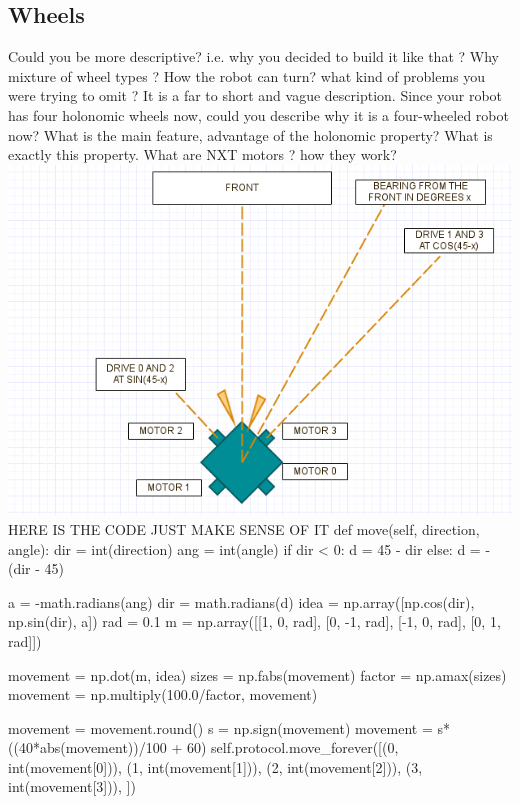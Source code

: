 \documentclass[a4paper,12pt]{article}
\begin{document}
\subsection{Wheels}
Could you be more descriptive? i.e. why you decided to build it like that ? Why mixture of wheel types ? How the robot can turn? what kind of problems you were trying to omit ? It is a far to short and vague description.  Since your robot has four holonomic wheels now, could you describe why it is a four-wheeled robot now? What is the main feature, advantage of the holonomic property? What is exactly this property.  What are NXT motors ? how they work?
\includegraphics[scale=.5]{holonomics.png}
HERE IS THE CODE JUST MAKE SENSE OF IT\newline\newline
def move(self, direction, angle):
        dir = int(direction)
        ang = int(angle)
        if dir < 0:
            d = 45 - dir
        else:
            d = -(dir - 45)

        a = -math.radians(ang)
        dir = math.radians(d)
        idea = np.array([np.cos(dir), np.sin(dir), a])
        rad = 0.1
        m = np.array([[1, 0, rad],
                      [0, -1, rad],
                      [-1, 0, rad],
                      [0, 1, rad]])

        movement = np.dot(m, idea)
        sizes = np.fabs(movement)
        factor = np.amax(sizes)
        movement = np.multiply(100.0/factor, movement)

        movement = movement.round()
        s = np.sign(movement)
        movement = s*((40*abs(movement))/100 + 60)
        self.protocol.move\_forever([(0, int(movement[0])), (1, int(movement[1])), (2, int(movement[2])), (3, int(movement[3])), ])
\end{document}
